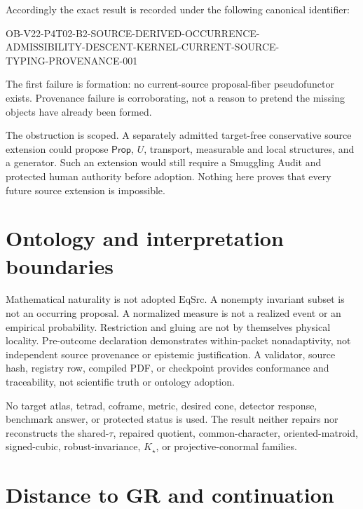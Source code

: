 \documentclass[11pt]{article}
\newcommand{\Prop}{\mathsf{Prop}}
\begin{document}
Accordingly the exact result is recorded under the following canonical
identifier:
\begin{center}
\small\ttfamily
OB-V22-P4T02-B2-SOURCE-DERIVED-OCCURRENCE-\\
ADMISSIBILITY-DESCENT-KERNEL-CURRENT-SOURCE-\\
TYPING-PROVENANCE-001
\end{center}
The first failure is formation: no current-source proposal-fiber
pseudofunctor exists.  Provenance failure is corroborating, not a reason to
pretend the missing objects have already been formed.

The obstruction is scoped.  A separately admitted target-free conservative
source extension could propose $\Prop$, $U$, transport, measurable and local
structures, and a generator.  Such an extension would still require a
Smuggling Audit and protected human authority before adoption.  Nothing here
proves that every future source extension is impossible.

\section{Ontology and interpretation boundaries}

Mathematical naturality is not adopted $\mathrm{EqSrc}$.  A nonempty invariant
subset is not an occurring proposal.  A normalized measure is not a realized
event or an empirical probability.  Restriction and gluing are not by
themselves physical locality.  Pre-outcome declaration demonstrates
within-packet nonadaptivity, not independent source provenance or epistemic
justification.  A validator, source hash, registry row, compiled PDF, or
checkpoint provides conformance and traceability, not scientific truth or
ontology adoption.

No target atlas, tetrad, coframe, metric, desired cone, detector response,
benchmark answer, or protected status is used.  The result neither repairs
nor reconstructs the shared-$\tau$, repaired quotient, common-character,
oriented-matroid, signed-cubic, robust-invariance, $K_\star$, or
projective-conormal families.

\section{Distance to GR and continuation}
\end{document}
